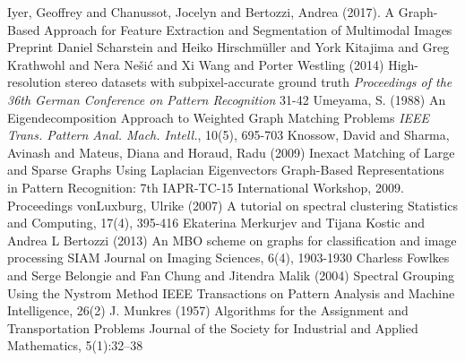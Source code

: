 \documentclass{beamer}
\begin{document}
\begin{frame}[allowframebreaks]
{\begin{thebibliography}{99}
     Iyer, Geoffrey and Chanussot, Jocelyn and Bertozzi, Andrea (2017).
      \newblock A Graph-Based Approach for Feature Extraction and Segmentation of Multimodal Images
      \newblock Preprint
     Daniel Scharstein and Heiko Hirschm\"{u}ller and York Kitajima and Greg Krathwohl and Nera Ne\v{s}i\'{c} and Xi Wang and Porter Westling (2014)
      \newblock High-resolution stereo datasets with subpixel-accurate ground truth
      \newblock \emph{Proceedings of the 36th German Conference on Pattern Recognition} 31-42
     Umeyama, S. (1988)
      \newblock An Eigendecomposition Approach to Weighted Graph Matching Problems
      \newblock \emph{IEEE Trans. Pattern Anal. Mach. Intell.}, 10(5), 695-703
     Knossow, David and Sharma, Avinash and Mateus, Diana and Horaud, Radu (2009)
      \newblock Inexact Matching of Large and Sparse Graphs Using Laplacian Eigenvectors
      \newblock Graph-Based Representations in Pattern Recognition: 7th IAPR-TC-15 International Workshop, 2009. Proceedings
     vonLuxburg, Ulrike (2007)
      \newblock A tutorial on spectral clustering
      \newblock Statistics and Computing, 17(4), 395-416
     Ekaterina Merkurjev and Tijana Kostic and Andrea L Bertozzi (2013)
      \newblock An MBO scheme on graphs for classification and image processing
      \newblock SIAM Journal on Imaging Sciences, 6(4), 1903-1930
     Charless Fowlkes and Serge Belongie and Fan Chung and Jitendra Malik (2004)
      \newblock Spectral Grouping Using the Nystrom Method
      \newblock IEEE Transactions on Pattern Analysis and Machine Intelligence, 26(2)
     J. Munkres (1957)
      \newblock Algorithms for the Assignment and Transportation Problems
      \newblock Journal of the Society for Industrial and Applied Mathematics, 5(1):32–38
    \end{thebibliography}
  }
\end{frame}

\end{document}
